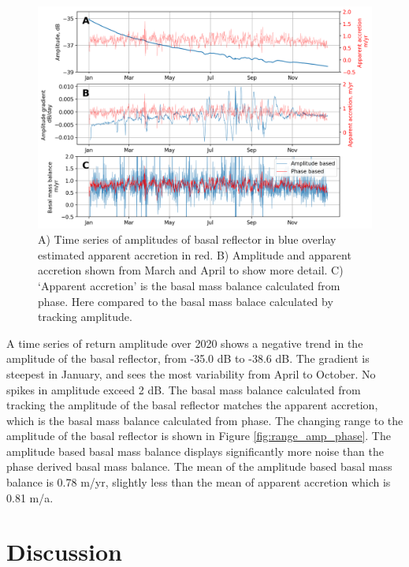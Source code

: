 \begin{figure}[!ht]
\centering
\includegraphics[width=1\textwidth]{chapters/3/amplitudes.png}
\caption[]{A) Time series of amplitudes of basal reflector in blue overlay estimated apparent accretion in red. B) Amplitude and apparent accretion shown from March and April to show more detail. C) `Apparent accretion' is the basal mass balance calculated from phase. Here compared to the basal mass balace calculated by tracking amplitude.
}
\label{fig:amplitudes}
\end{figure}
A time series of return amplitude over 2020 shows a negative trend in the amplitude of the basal reflector, from -35.0 dB to -38.6 dB. 
The gradient is steepest in January, and sees the most variability from April to October. No spikes in amplitude exceed 2 dB.
The basal mass balance calculated from tracking the amplitude of the basal reflector matches the apparent accretion, which is the basal mass balance calculated from phase. The changing range to the amplitude of the basal reflector is shown in 
Figure \ref{fig:range_amp_phase}. The amplitude based  basal mass balance displays significantly more noise than the phase derived basal mass balance. The mean of the amplitude based  basal mass balance is 0.78 m/yr, slightly less than the mean of apparent accretion which is 0.81 m/a.

\newpage

\section{Discussion} \label{sec:apres_discussion}


